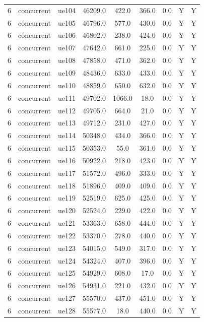 \begin{table}[ht]
\begin{tabular}{|c|c|c|c|c|c|c|c|c|}
6 & concurrent & ue104 & 46209.0 & 422.0 & 366.0 & 0.0 & Y & Y \\
6 & concurrent & ue105 & 46796.0 & 577.0 & 430.0 & 0.0 & Y & Y \\
6 & concurrent & ue106 & 46802.0 & 238.0 & 424.0 & 0.0 & Y & Y \\
6 & concurrent & ue107 & 47642.0 & 661.0 & 225.0 & 0.0 & Y & Y \\
6 & concurrent & ue108 & 47858.0 & 471.0 & 362.0 & 0.0 & Y & Y \\
6 & concurrent & ue109 & 48436.0 & 633.0 & 433.0 & 0.0 & Y & Y \\
6 & concurrent & ue110 & 48859.0 & 650.0 & 632.0 & 0.0 & Y & Y \\
6 & concurrent & ue111 & 49702.0 & 1066.0 & 18.0 & 0.0 & Y & Y \\
6 & concurrent & ue112 & 49705.0 & 664.0 & 21.0 & 0.0 & Y & Y \\
6 & concurrent & ue113 & 49712.0 & 231.0 & 427.0 & 0.0 & Y & Y \\
6 & concurrent & ue114 & 50348.0 & 434.0 & 366.0 & 0.0 & Y & Y \\
6 & concurrent & ue115 & 50353.0 & 55.0 & 361.0 & 0.0 & Y & Y \\
6 & concurrent & ue116 & 50922.0 & 218.0 & 423.0 & 0.0 & Y & Y \\
6 & concurrent & ue117 & 51572.0 & 496.0 & 333.0 & 0.0 & Y & Y \\
6 & concurrent & ue118 & 51896.0 & 409.0 & 409.0 & 0.0 & Y & Y \\
6 & concurrent & ue119 & 52519.0 & 625.0 & 425.0 & 0.0 & Y & Y \\
6 & concurrent & ue120 & 52524.0 & 229.0 & 422.0 & 0.0 & Y & Y \\
6 & concurrent & ue121 & 53363.0 & 658.0 & 444.0 & 0.0 & Y & Y \\
6 & concurrent & ue122 & 53370.0 & 278.0 & 440.0 & 0.0 & Y & Y \\
6 & concurrent & ue123 & 54015.0 & 549.0 & 317.0 & 0.0 & Y & Y \\
6 & concurrent & ue124 & 54324.0 & 407.0 & 396.0 & 0.0 & Y & Y \\
6 & concurrent & ue125 & 54929.0 & 608.0 & 17.0 & 0.0 & Y & Y \\
6 & concurrent & ue126 & 54931.0 & 221.0 & 432.0 & 0.0 & Y & Y \\
6 & concurrent & ue127 & 55570.0 & 437.0 & 451.0 & 0.0 & Y & Y \\
6 & concurrent & ue128 & 55577.0 & 18.0 & 440.0 & 0.0 & Y & Y \\

\end{tabular}
\end{table}
